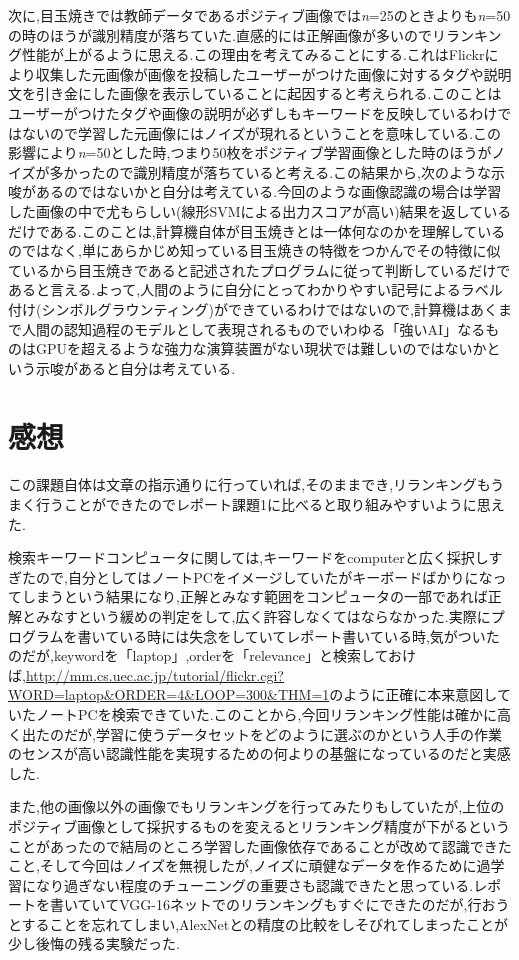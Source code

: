 \documentclass[11pt,a4j]{jreport}
\begin{document}
次に,目玉焼きでは教師データであるポジティブ画像では\textit{n}=25のときよりも\textit{n}=50の時のほうが識別精度が落ちていた.直感的には正解画像が多いのでリランキング性能が上がるように思える.この理由を考えてみることにする.これはFlickrにより収集した元画像が画像を投稿したユーザーがつけた画像に対するタグや説明文を引き金にした画像を表示していることに起因すると考えられる.このことはユーザーがつけたタグや画像の説明が必ずしもキーワードを反映しているわけではないので学習した元画像にはノイズが現れるということを意味している.この影響により\textit{n}=50とした時,つまり50枚をポジティブ学習画像とした時のほうがノイズが多かったので識別精度が落ちていると考える.この結果から,次のような示唆があるのではないかと自分は考えている.今回のような画像認識の場合は学習した画像の中で尤もらしい(線形SVMによる出力スコアが高い)結果を返しているだけである.このことは,計算機自体が目玉焼きとは一体何なのかを理解しているのではなく,単にあらかじめ知っている目玉焼きの特徴をつかんでその特徴に似ているから目玉焼きであると記述されたプログラムに従って判断しているだけであると言える.よって,人間のように自分にとってわかりやすい記号によるラベル付け(シンボルグラウンティング)ができているわけではないので,計算機はあくまで人間の認知過程のモデルとして表現されるものでいわゆる「強いAI」なるものはGPUを超えるような強力な演算装置がない現状では難しいのではないかという示唆があると自分は考えている.

\section{感想}
この課題自体は文章の指示通りに行っていれば,そのままでき,リランキングもうまく行うことができたのでレポート課題1に比べると取り組みやすいように思えた.

検索キーワードコンピュータに関しては,キーワードをcomputerと広く採択しすぎたので,自分としてはノートPCをイメージしていたがキーボードばかりになってしまうという結果になり,正解とみなす範囲をコンピュータの一部であれば正解とみなすという緩めの判定をして,広く許容しなくてはならなかった.実際にプログラムを書いている時には失念をしていてレポート書いている時,気がついたのだが,keywordを「laptop」,orderを「relevance」と検索しておけば,\url{http://mm.cs.uec.ac.jp/tutorial/flickr.cgi?WORD=laptop&ORDER=4&LOOP=300&THM=1}のように正確に本来意図していたノートPCを検索できていた.このことから,今回リランキング性能は確かに高く出たのだが,学習に使うデータセットをどのように選ぶのかという人手の作業のセンスが高い認識性能を実現するための何よりの基盤になっているのだと実感した.

また,他の画像以外の画像でもリランキングを行ってみたりもしていたが,上位のポジティブ画像として採択するものを変えるとリランキング精度が下がるということがあったので結局のところ学習した画像依存であることが改めて認識できたこと,そして今回はノイズを無視したが,ノイズに頑健なデータを作るために過学習になり過ぎない程度のチューニングの重要さも認識できたと思っている.レポートを書いていてVGG-16ネットでのリランキングもすぐにできたのだが,行おうとすることを忘れてしまい,AlexNetとの精度の比較をしそびれてしまったことが少し後悔の残る実験だった.
\end{document}
